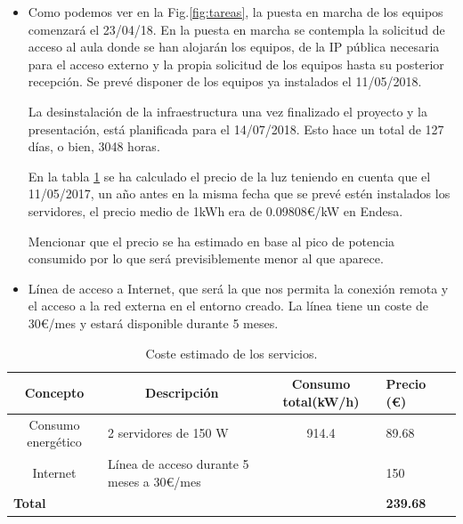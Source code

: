 \begin{itemize}
\item Como podemos ver en la Fig.\ref{fig:tareas}, la puesta en marcha de los equipos comenzará el 23/04/18. En la puesta en marcha se contempla la solicitud de acceso al aula donde se han alojarán los equipos, de la IP pública necesaria para el acceso externo y la propia solicitud de los equipos hasta su posterior recepción. Se prevé disponer de los equipos ya instalados el 11/05/2018.

La desinstalación de la infraestructura  una vez finalizado el proyecto y la presentación, está planificada para el 14/07/2018. Esto hace un total de 127 días, o bien, 3048 horas.

En la tabla \ref{tab:costes-servicios} se ha calculado el precio de la luz teniendo en cuenta que el 11/05/2017, un año antes en la misma fecha que se prevé estén instalados los servidores, el precio medio de 1kWh era de 0.09808\euro/kW en Endesa.\cite{noauthor_endesa_nodate}

Mencionar que el precio se ha estimado en base al pico de potencia consumido por lo que será previsiblemente menor al que aparece.

\item Línea de acceso a Internet, que será la que nos permita la conexión remota y el acceso a la red externa en el entorno creado. La línea tiene un coste de 30\euro/mes y estará disponible durante 5 meses.
\end{itemize}


\renewcommand\arraystretch{1.1}
\begin{table}[!h]
\centering
\begin{adjustbox}{max width=\textwidth}
\begin{tabular}{|c|l|c|l|c|}
\hline
\textbf{Concepto} &  \multicolumn{1}{|c|}{\textbf{Descripción}} & \textbf{Consumo total(kW/h)}  & \textbf{Precio (\euro)}  \\
\hline \hline
Consumo energético & 2 servidores de 150 W  & 914.4 & 89.68\\
\hline
Internet & Línea de acceso durante 5 meses a 30\euro/mes &  & 150  \\
\hline
\multicolumn{3}{|l|}{\textbf{Total}} & \textbf{239.68} \\
\hline
\end{tabular}
\end{adjustbox}
\caption{Coste estimado de los servicios.}
\label{tab:costes-servicios}
\end{table}


